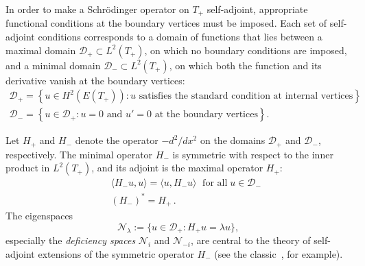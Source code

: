 \documentclass[12pt]{article}
\newcommand{\Dmax}{\mathcal{D}_+}
\newcommand{\Dmin}{\mathcal{D}_-}
\newcommand{\Dloc}{\mathcal{D}_\text{\!loc}}
\newcommand{\Hmax}{H_+}
\newcommand{\Hmin}{H_-}
\newcommand{\Nplus}{{\mathcal N}_i}
\newcommand{\Nminus}{{\mathcal N}_{-i}}
\newcommand{\Nlambda}{{\mathcal N}_\lambda}
\newcommand{\Hloc}{H^2_\text{loc}}
\begin{document}
In order to make a Schr\"odinger operator on $T_+$ self-adjoint, appropriate functional conditions at the boundary vertices must be imposed.  Each set of self-adjoint conditions corresponds to a domain of functions that lies between a maximal domain $\Dmax\subset L^2(T_+)$, on which no boundary conditions are imposed, and a minimal domain $\Dmin\subset L^2(T_+)$, on which both the function and its derivative vanish at the boundary vertices:
%
\begin{equation}
\renewcommand{\arraystretch}{1.1}
\left.
\begin{array}{l}
    \Dmax = \left\{ u\in H^2(E(T_+)) :
            \text{$u$ satisfies the standard condition at internal vertices} \right\}\\
    \Dmin = \left\{ u\in \Dmax :
            \text{$u=0$ and $u'=0$ at the boundary vertices} \right\}.
\end{array}
\right.
\end{equation}
%
%
%

Let $\Hmax$ and $\Hmin$ denote the operator $-d^2/dx^2$ on the domains $\Dmax$ and $\Dmin$, respectively.
The minimal operator $H_-$ is symmetric with respect to the inner product in $L^2(T_+)$, and its adjoint is the maximal operator $H_+$:
%
\begin{eqnarray}
  && \langle H_- u, u \rangle = \langle u, H_- u \rangle \;\text{ for all}\; u\in\Dmin \\
  && (H_-)^* = H_+\,.
\end{eqnarray}
%
The eigenspaces
%
\begin{equation}
  \Nlambda := \{ u\in\Dmax : H_+ u = \lambda u \},
\end{equation}
%
especially the {\em deficiency spaces} $\Nplus$ and $\Nminus$, are central to the theory of self-adjoint extensions of the symmetric operator $H_-$ (see the classic~\cite{AkhiezerGlazman1993}, for example).
\end{document}
